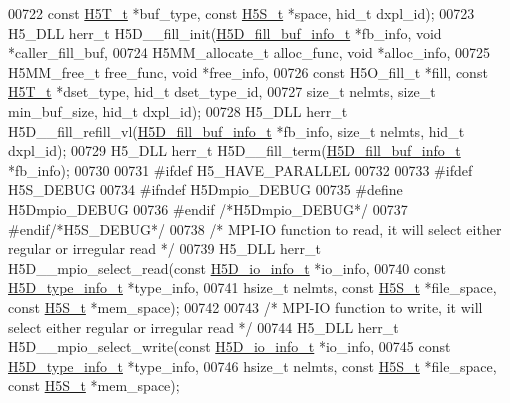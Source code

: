 \begin{DoxyCode}
00722     \textcolor{keyword}{const} \hyperlink{struct_h5_t__t}{H5T\_t} *buf\_type, \textcolor{keyword}{const} \hyperlink{struct_h5_s__t}{H5S\_t} *space, hid\_t dxpl\_id);
00723 H5\_DLL herr\_t H5D\_\_fill\_init(\hyperlink{struct_h5_d__fill__buf__info__t}{H5D\_fill\_buf\_info\_t} *fb\_info, \textcolor{keywordtype}{void} *caller\_fill\_buf,
00724     H5MM\_allocate\_t alloc\_func, \textcolor{keywordtype}{void} *alloc\_info,
00725     H5MM\_free\_t free\_func, \textcolor{keywordtype}{void} *free\_info,
00726     \textcolor{keyword}{const} H5O\_fill\_t *fill, \textcolor{keyword}{const} \hyperlink{struct_h5_t__t}{H5T\_t} *dset\_type, hid\_t dset\_type\_id,
00727     \textcolor{keywordtype}{size\_t} nelmts, \textcolor{keywordtype}{size\_t} min\_buf\_size, hid\_t dxpl\_id);
00728 H5\_DLL herr\_t H5D\_\_fill\_refill\_vl(\hyperlink{struct_h5_d__fill__buf__info__t}{H5D\_fill\_buf\_info\_t} *fb\_info, \textcolor{keywordtype}{size\_t} nelmts, hid\_t 
      dxpl\_id);
00729 H5\_DLL herr\_t H5D\_\_fill\_term(\hyperlink{struct_h5_d__fill__buf__info__t}{H5D\_fill\_buf\_info\_t} *fb\_info);
00730 
00731 \textcolor{preprocessor}{#ifdef H5\_HAVE\_PARALLEL}
00732 
00733 \textcolor{preprocessor}{#ifdef H5S\_DEBUG}
00734 \textcolor{preprocessor}{#ifndef H5Dmpio\_DEBUG}
00735 \textcolor{preprocessor}{#define H5Dmpio\_DEBUG}
00736 \textcolor{preprocessor}{#endif }\textcolor{comment}{/*H5Dmpio\_DEBUG*/}\textcolor{preprocessor}{}
00737 \textcolor{preprocessor}{#endif}\textcolor{comment}{/*H5S\_DEBUG*/}\textcolor{preprocessor}{}
00738 \textcolor{comment}{/* MPI-IO function to read, it will select either regular or irregular read */}
00739 H5\_DLL herr\_t H5D\_\_mpio\_select\_read(\textcolor{keyword}{const} \hyperlink{struct_h5_d__io__info__t}{H5D\_io\_info\_t} *io\_info,
00740     \textcolor{keyword}{const} \hyperlink{struct_h5_d__type__info__t}{H5D\_type\_info\_t} *type\_info,
00741     hsize\_t nelmts, \textcolor{keyword}{const} \hyperlink{struct_h5_s__t}{H5S\_t} *file\_space, \textcolor{keyword}{const} \hyperlink{struct_h5_s__t}{H5S\_t} *mem\_space);
00742 
00743 \textcolor{comment}{/* MPI-IO function to write, it will select either regular or irregular read */}
00744 H5\_DLL herr\_t H5D\_\_mpio\_select\_write(\textcolor{keyword}{const} \hyperlink{struct_h5_d__io__info__t}{H5D\_io\_info\_t} *io\_info,
00745     \textcolor{keyword}{const} \hyperlink{struct_h5_d__type__info__t}{H5D\_type\_info\_t} *type\_info,
00746     hsize\_t nelmts, \textcolor{keyword}{const} \hyperlink{struct_h5_s__t}{H5S\_t} *file\_space, \textcolor{keyword}{const} \hyperlink{struct_h5_s__t}{H5S\_t} *mem\_space);

\end{DoxyCode}
